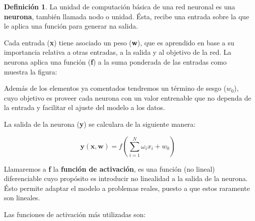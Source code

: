 \documentclass[12,twoside]{TFG-GM}
\theoremstyle{definition}
\newtheorem{definition}[theorem]{Definición}
\theoremstyle{remark}
\begin{document}
\begin{definition} 
La unidad de computación básica de una red neuronal es una \textbf{neurona}, también llamada nodo o unidad. Ésta, recibe una entrada sobre la que le aplica una función para generar na salida.
\end{definition}
Cada entrada (\textbf{x}) tiene asociado un peso (\textbf{w}), que es aprendido en base a su importancia relativa a otras entradas, a la salida y al objetivo de la red. La neurona  aplica una función (\textbf{f}) a la suma ponderada de las entradas como muestra la figura: 

Además de los elementos ya comentados tendremos un término de sesgo ($w_0$), cuyo objetivo es proveer cada neurona con un valor entrenable que no dependa de la entrada y facilitar el ajuste del modelo a los datos. 

La salida de la neurona (\textbf{y}) se calculara de la siguiente manera: 

$$
\mathbf{y}(\mathbf{x},\mathbf{w}) = f \left(\sum_{i=1}^N \omega_i x_i + w_0 \right) 
$$

Llamaremos a \textbf{f} la \textbf{función de activación}, es una función (no lineal) diferenciable cuyo propósito es introducir no linealidad a la salida de la neurona. Ésto permite adaptar el modelo a problemas reales, puesto a que estos raramente son lineales. 

Las funciones de activación más utilizadas son: 
\end{document}
